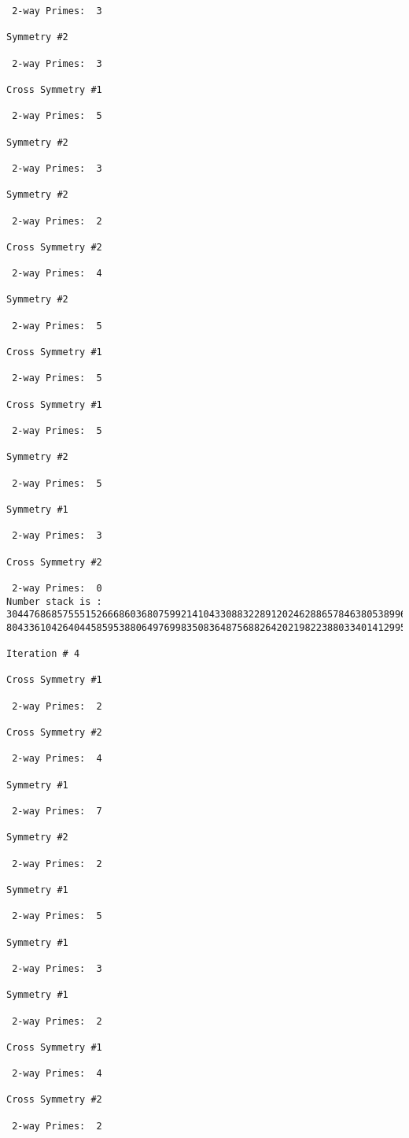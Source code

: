 {{{{\begin{verbatim}
 2-way Primes: 	3

Symmetry #2

 2-way Primes: 	3

Cross Symmetry #1

 2-way Primes: 	5

Symmetry #2

 2-way Primes: 	3

Symmetry #2

 2-way Primes: 	2

Cross Symmetry #2

 2-way Primes: 	4

Symmetry #2

 2-way Primes: 	5

Cross Symmetry #1

 2-way Primes: 	5

Cross Symmetry #1

 2-way Primes: 	5

Symmetry #2

 2-way Primes: 	5

Symmetry #1

 2-way Primes: 	3

Cross Symmetry #2

 2-way Primes: 	0
Number stack is :
30447686857555152666860368075992141043308832289120246288657846380538996794608835958544046240163340857
80433610426404458595388064976998350836487568826420219822388033401412995708630686662515557586867440375

Iteration #	4

Cross Symmetry #1

 2-way Primes: 	2

Cross Symmetry #2

 2-way Primes: 	4

Symmetry #1

 2-way Primes: 	7

Symmetry #2

 2-way Primes: 	2

Symmetry #1

 2-way Primes: 	5

Symmetry #1

 2-way Primes: 	3

Symmetry #1

 2-way Primes: 	2

Cross Symmetry #1

 2-way Primes: 	4

Cross Symmetry #2

 2-way Primes: 	2


\end{verbatim}}}}}
